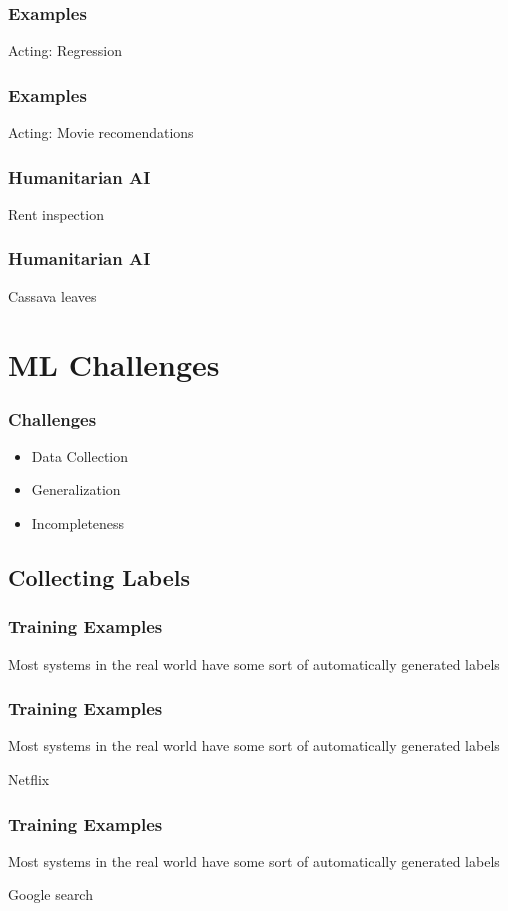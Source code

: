 \documentclass[10pt,mathserif]{beamer}
\begin{document}
\begin{frame}
  \frametitle{Examples}
  Acting: Regression
\end{frame}

\begin{frame}
  \frametitle{Examples}
  Acting: Movie recomendations
\end{frame}

\begin{frame}
  \frametitle{Humanitarian AI}
  Rent inspection
\end{frame}

\begin{frame}
  \frametitle{Humanitarian AI}
  Cassava leaves 
\end{frame}

\section{ML Challenges}
\label{sec:label}

\begin{frame}
  \frametitle{Challenges}
  \begin{itemize}
  \item Data Collection
  \item Generalization
  \item Incompleteness
  \end{itemize} 
\end{frame}

\subsection{Collecting Labels}
\label{subsec:label}

\begin{frame}
  \frametitle{Training Examples}
  Most systems in the real world have some sort of automatically generated labels
\end{frame}

\begin{frame}
  \frametitle{Training Examples}
  Most systems in the real world have some sort of automatically generated labels

  Netflix
\end{frame}

\begin{frame}
  \frametitle{Training Examples}
  Most systems in the real world have some sort of automatically generated labels

  Google search
\end{frame}
\end{document}
